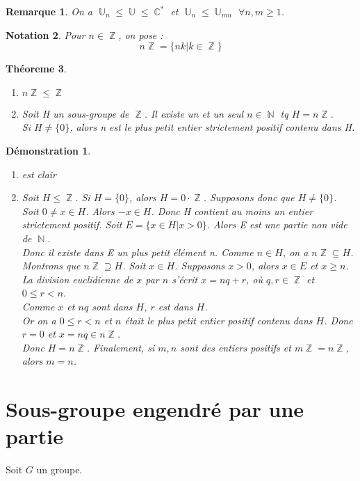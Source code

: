 \documentclass[a4paper, oneside]{report}
\theoremstyle{break}
\newtheorem{thm}{Théoreme}[section] %
\newtheorem{nota}[thm]{Notation}
\newtheorem{remar}[thm]{Remarque}
\newtheorem*{demo}{Démonstration}
\DeclareMathOperator{\N}{\mathbb{N}}
\DeclareMathOperator{\C}{\mathbb{C}}
\DeclareMathOperator{\Z}{\mathbb{Z}}
\DeclareMathOperator{\U}{\mathbb{U}}
\begin{document}
\begin{remar}
	On a $\U_n \leq \U \leq \C^*$ et $\U_n \leq \U_{mn}$ $\forall n,m\geq 1$.\\
\end{remar}

\begin{nota}
	Pour $n\in \Z$, on pose :
	$$n\Z = \{nk| k\in \Z \}$$
\end{nota}

\begin{thm}
	\begin{enumerate}
		\item $n\Z \leq \Z$
		\item Soit H un sous-groupe de $\Z$. Il existe un et un seul $n\in \N$ tq $H=n\Z$.\\
		Si $H\neq \{0\}$, alors n est le plus petit entier strictement positif contenu dans H.
	\end{enumerate}
\end{thm}

\begin{demo}
	\begin{enumerate}
		\item est clair
		\item Soit $H \leq \Z$. Si $H=\{0\}$, alors $H=0\cdot\Z$. Supposons donc que $H\neq \{0\}$.\\
		Soit $0\neq x\in H$. Alors $-x\in H$. Donc H contient au moins un entier strictement positif. Soit $E=\{x\in H | x>0 \}$. Alors E est une partie non vide de $\N$.\\
		Donc il existe dans E un plus petit élément n. Comme $n\in H$, on a $n\Z \subseteq H$.\\
		Montrons que $n\Z \supseteq H$. Soit $x\in H$. Supposons $x>0$, alors $x\in E$ et $x\geq n$.\\
		La division euclidienne de $x$ par $n$ s'écrit $x=nq+r$, où $q,r\in \Z$ et $0\leq r< n$.\\
		Comme $x$ et $nq$ sont dans $H$, $r$ est dans $H$.\\
		Or on a $0\leq r<n$ et $n$ était le plus petit entier positif contenu dans $H$. Donc $r=0$ et $x=nq \in n\Z$.\\
		Donc $H=n\Z$. Finalement, si $m,n$ sont des entiers positifs et $m\Z=n\Z$, alors $m=n$.
	\end{enumerate}
\end{demo}

\section{Sous-groupe engendré par une partie}
Soit $G$ un groupe.
\end{document}
